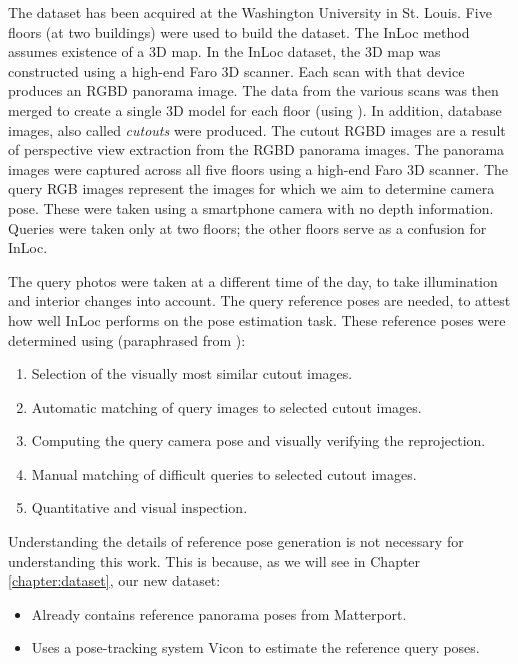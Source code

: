 \documentclass[twoside]{ctuthesis}
\theoremstyle{plain}
\theoremstyle{definition}
\theoremstyle{note}
\begin{document}
The dataset has been acquired at the Washington University in St. Louis. Five floors (at two buildings) were used to build the dataset. The InLoc method assumes existence of a 3D map. In the InLoc dataset, the 3D map was constructed using a high-end Faro 3D scanner. Each scan with that device produces an RGBD panorama image. The data from the various scans was then merged to create a single 3D model for each floor (using \cite{wijmans17rgbd}). In addition, database images, also called \emph{cutouts} were produced. The cutout RGBD images are a result of perspective view extraction from the RGBD panorama images. The panorama images were captured across all five floors using a high-end Faro 3D scanner. The query RGB images represent the images for which we aim to determine camera pose. These were taken using a smartphone camera with no depth information. Queries were taken only at two floors; the other floors serve as a confusion for InLoc.

The query photos were taken at a different time of the day, to take illumination and interior changes into account. The query reference poses are needed, to attest how well InLoc performs on the pose estimation task. These reference poses were determined using (paraphrased from \cite{taira2018inloc}):

\begin{enumerate}
	\item Selection of the visually most similar cutout images.
	\item Automatic matching of query images to selected cutout images.
	\item Computing the query camera pose and visually verifying the reprojection.
	\item Manual matching of difficult queries to selected cutout images.
	\item Quantitative and visual inspection.
\end{enumerate}

Understanding the details of reference pose generation is not necessary for understanding this work. This is because, as we will see in Chapter \ref{chapter:dataset}, our new dataset:

\begin{itemize}
	\item Already contains reference panorama poses from Matterport.
	\item Uses a pose-tracking system Vicon to estimate the reference query poses.
\end{itemize}
\end{document}
